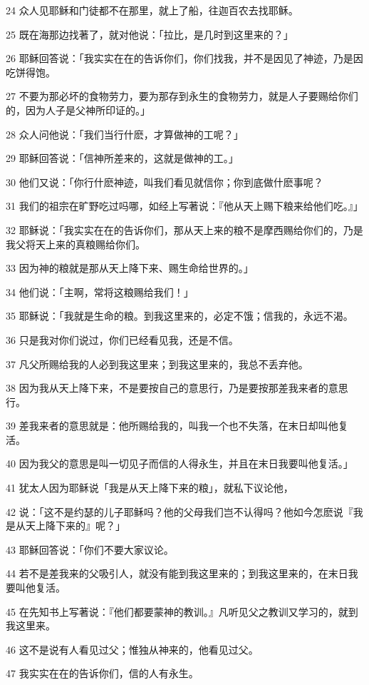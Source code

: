\par 24 众人见耶稣和门徒都不在那里，就上了船，往迦百农去找耶稣。
\par 25 既在海那边找著了，就对他说：「拉比，是几时到这里来的？」
\par 26 耶稣回答说：「我实实在在的告诉你们，你们找我，并不是因见了神迹，乃是因吃饼得饱。
\par 27 不要为那必坏的食物劳力，要为那存到永生的食物劳力，就是人子要赐给你们的，因为人子是父神所印证的。」
\par 28 众人问他说：「我们当行什麽，才算做神的工呢？」
\par 29 耶稣回答说：「信神所差来的，这就是做神的工。」
\par 30 他们又说：「你行什麽神迹，叫我们看见就信你；你到底做什麽事呢？
\par 31 我们的祖宗在旷野吃过吗哪，如经上写著说：『他从天上赐下粮来给他们吃。』」
\par 32 耶稣说：「我实实在在的告诉你们，那从天上来的粮不是摩西赐给你们的，乃是我父将天上来的真粮赐给你们。
\par 33 因为神的粮就是那从天上降下来、赐生命给世界的。」
\par 34 他们说：「主啊，常将这粮赐给我们！」
\par 35 耶稣说：「我就是生命的粮。到我这里来的，必定不饿；信我的，永远不渴。
\par 36 只是我对你们说过，你们已经看见我，还是不信。
\par 37 凡父所赐给我的人必到我这里来；到我这里来的，我总不丢弃他。
\par 38 因为我从天上降下来，不是要按自己的意思行，乃是要按那差我来者的意思行。
\par 39 差我来者的意思就是：他所赐给我的，叫我一个也不失落，在末日却叫他复活。
\par 40 因为我父的意思是叫一切见子而信的人得永生，并且在末日我要叫他复活。」
\par 41 犹太人因为耶稣说「我是从天上降下来的粮」，就私下议论他，
\par 42 说：「这不是约瑟的儿子耶稣吗？他的父母我们岂不认得吗？他如今怎麽说『我是从天上降下来的』呢？」
\par 43 耶稣回答说：「你们不要大家议论。
\par 44 若不是差我来的父吸引人，就没有能到我这里来的；到我这里来的，在末日我要叫他复活。
\par 45 在先知书上写著说：『他们都要蒙神的教训。』凡听见父之教训又学习的，就到我这里来。
\par 46 这不是说有人看见过父；惟独从神来的，他看见过父。
\par 47 我实实在在的告诉你们，信的人有永生。
